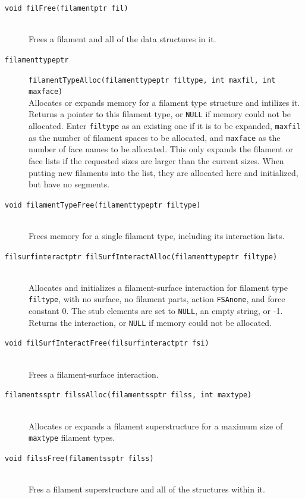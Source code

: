 \documentclass {scrbook}
\newcommand {\ttt} {\texttt}
\begin{document}
\begin{description}
\item[\ttt{void filFree(filamentptr fil)}]
\hfill \\
Frees a filament and all of the data structures in it.

\item[\ttt{filamenttypeptr}]
\ttt{filamentTypeAlloc(filamenttypeptr filtype, int maxfil, int maxface)}
\hfill \\
Allocates or expands memory for a filament type structure and intilizes it. Returns a pointer to this filament type, or \ttt{NULL} if memory could not be allocated. Enter \ttt{filtype} as an existing one if it is to be expanded, \ttt{maxfil} as the number of filament spaces to be allocated, and \ttt{maxface} as the number of face names to be allocated. This only expands the filament or face lists if the requested sizes are larger than the current sizes. When putting new filaments into the list, they are allocated here and initialized, but have no segments.

\item[\ttt{void filamentTypeFree(filamenttypeptr filtype)}]
\hfill \\
Frees memory for a single filament type, including its interaction lists.

\item[\ttt{filsurfinteractptr filSurfInteractAlloc(filamenttypeptr filtype)}] %
\hfill \\
Allocates and initializes a filament-surface interaction for filament type \ttt{filtype}, with no surface, no filament parts, action \ttt{FSAnone}, and force constant 0. The stub elements are set to \ttt{NULL}, an empty string, or -1. Returns the interaction, or \ttt{NULL} if memory could not be allocated.

\item[\ttt{void filSurfInteractFree(filsurfinteractptr fsi)}] %
\hfill \\
Frees a filament-surface interaction.

\item[\ttt{filamentssptr filssAlloc(filamentssptr filss, int maxtype)}]
\hfill \\
Allocates or expands a filament superstructure for a maximum size of \ttt{maxtype} filament types.

\item[\ttt{void filssFree(filamentssptr filss)}]
\hfill \\
Fres a filament superstructure and all of the structures within it.



\end{description}
\end{document}
